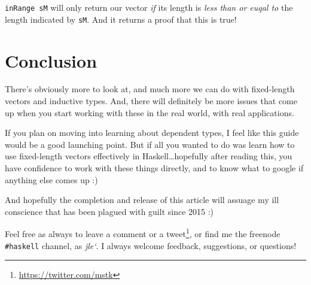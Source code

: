\documentclass[]{article}
\renewcommand{\href}[2]{#2\footnote{\url{#1}}}
\begin{document}
\texttt{inRange\ sM} will only return our vector \emph{if} its length is
\emph{less than or euqal to} the length indicated by \texttt{sM}. And it returns
a proof that this is true!

\section{Conclusion}\label{conclusion}

There's obviously more to look at, and much more we can do with fixed-length
vectors and inductive types. And, there will definitely be more issues that come
up when you start working with these in the real world, with real applications.

If you plan on moving into learning about dependent types, I feel like this
guide would be a good launching point. But if all you wanted to do was learn how
to use fixed-length vectors effectively in Haskell\ldots{}hopefully after
reading this, you have confidence to work with these things directly, and to
know what to google if anything else comes up :)

And hopefully the completion and release of this article will assuage my ill
conscience that has been plagued with guilt since 2015 :)

Feel free as always to leave a comment or a
\href{https://twitter.com/mstk}{tweet}, or find me the freenode
\texttt{\#haskell} channel, as \emph{jle`}. I always welcome feedback,
suggestions, or questions!
\end{document}
